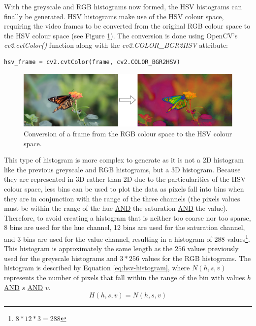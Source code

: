 With the greyscale and RGB histograms now formed, the HSV histograms can finally be generated. HSV histograms make use of the HSV colour space, requiring the video frames to be converted from the original RGB colour space to the HSV colour space (see Figure \ref{fig:rgb_to_hsv}). The conversion is done using OpenCV's \textit{cv2.cvtColor()} function along with the \textit{cv2.COLOR\_BGR2HSV} attribute:

\begin{lstlisting}[numbers=none]
hsv_frame = cv2.cvtColor(frame, cv2.COLOR_BGR2HSV)
\end{lstlisting}

\begin{figure}[h] 
\centerline{\includegraphics[width=\textwidth]{figures/implementation/rgb_to_hsv.png}}
\caption{\label{fig:rgb_to_hsv}Conversion of a frame from the RGB colour space to the HSV colour space.}
\end{figure}

This type of histogram is more complex to generate as it is not a 2D histogram like the previous greyscale and RGB histograms, but a 3D histogram. Because they are represented in 3D rather than 2D due to the particularities of the HSV colour space, less bins can be used to plot the data as pixels fall into bins when they are in conjunction with the range of the three channels (the pixels values must be within the range of the hue \underline{AND} the saturation \underline{AND} the value). Therefore, to avoid creating a histogram that is neither too coarse nor too sparse, 8 bins are used for the hue channel, 12 bins are used for the saturation channel, and 3 bins are used for the value channel, resulting in a histogram of 288 values\footnote{$8*12*3=288$}. This histogram is approximately the same length as the $256$ values previously used for the greyscale histograms and $3*256$ values for the RGB histograms. The histogram is described by Equation \ref{eq:hsv-histogram}, where $N(h,s,v)$ represents the number of pixels that fall within the range of the bin with values $h$ \underline{AND} $s$ \underline{AND} $v$.\\
\begin{equation}
\label{eq:hsv-histogram}
    H(h,s,v)=N(h,s,v)
\end{equation}

